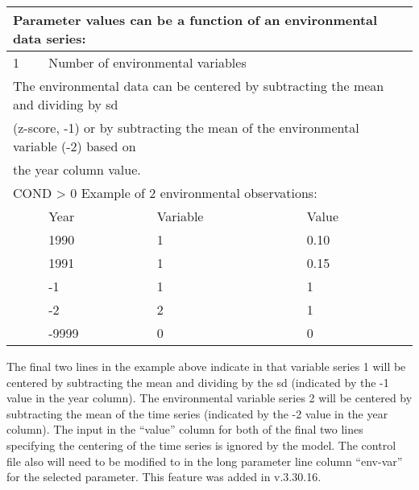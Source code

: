 \begin{center}
	\vspace*{-\baselineskip}
	\begin{tabular}{p{1cm} p{2cm} p{2cm} p{1cm}}
		\multicolumn{4}{l}{Parameter values can be a function of an environmental data series:} \\
		\hline
		1 & \multicolumn{3}{l}{Number of environmental variables} \Tstrut\Bstrut\\
		\multicolumn{4}{l}{The environmental data can be centered by subtracting the mean and dividing by \gls{sd}} \\
		\multicolumn{4}{l}{(z-score, -1) or by subtracting the mean of the environmental variable (-2) based on} \\
		\multicolumn{4}{l}{the year column value.} \\
		\hline
		\multicolumn{4}{l}{COND > 0  Example of 2 environmental observations:} \Tstrut\\
		  & Year & Variable & Value \Bstrut\\
		\hline
		  & 1990 & 1 & 0.10 \Tstrut\\
		  & 1991 & 1 & 0.15 \\
		  & -1   & 1 & 1 \\
		  & -2   & 2 & 1 \\
		  & -9999 & 0 & 0 \Bstrut\\
		\hline
	\end{tabular}
	\leavevmode\tagmcend\tagstructend\par
\end{center}

The final two lines in the example above indicate in that variable series 1 will be centered by subtracting the mean and dividing by the \gls{sd} (indicated by the -1 value in the year column). The environmental variable series 2 will be centered by subtracting the mean of the time series (indicated by the -2 value in the year column). The input in the ``value'' column for both of the final two lines specifying the centering of the time series is ignored by the model. The control file also will need to be modified to in the long parameter line column ``env-var'' for the selected parameter. This feature was added in v.3.30.16.


